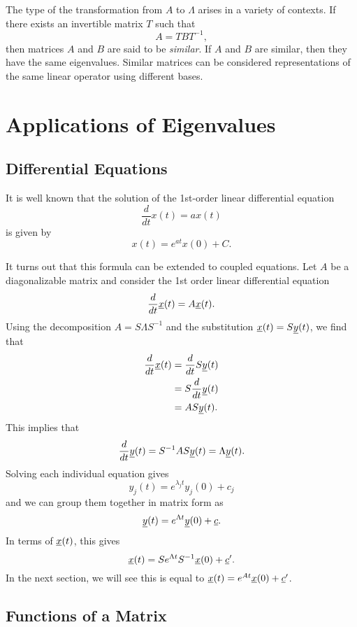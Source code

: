 The type of the transformation from $A$ to $\Lambda$ arises in a variety of contexts.
If there exists an invertible matrix $T$ such that
\begin{equation*}
A = T B T^{-1},
\end{equation*}
then matrices $A$ and $B$ are said to be \emph{similar}.
If $A$ and $B$ are similar, then they have the same eigenvalues.
Similar matrices can be considered representations of the same linear operator using different bases.

\section{Applications of Eigenvalues}

\subsection{Differential Equations}
\label{sec:Differential_Equations}

It is well known that the solution of the 1st-order linear differential equation
\[ \frac{d}{dt} x(t) = a x(t) \]
is given by
\[ x(t) = e^{at} x(0) + C. \]

It turns out that this formula can be extended to coupled equations.
Let $A$ be a diagonalizable matrix and consider the 1st order linear differential equation
\[ \frac{d}{dt} \underline{x}(t) = A \underline{x}(t). \]
Using the decomposition $A = S \Lambda S^{-1}$ and the substitution $\underline{x}(t) = S \underline{y}(t)$, we find that
\begin{align*}
\frac{d}{dt} \underline{x}(t)
& = \frac{d}{dt} S \underline{y}(t) \\
& = S \frac{d}{dt} \underline{y}(t) \\
& = A S \underline{y}(t).
\end{align*}
This implies that
\[ \frac{d}{dt} \underline{y}(t) = S^{-1} A S \underline{y}(t) = \Lambda \underline{y}(t). \]
Solving each individual equation gives
\[ y_j (t) = e^{\lambda_j t} y_j (0) + c_j \]
and we can group them together in matrix form as
\[ \underline{y}(t) = e^{\Lambda t} \underline{y}(0) + \underline{c}. \]
In terms of $\underline{x}(t)$, this gives
\[ \underline{x}(t) = S e^{\Lambda t} S^{-1} \underline{x}(0) + \underline{c}'. \]
In the next section, we will see this is equal to $ \underline{x}(t) = e^{A t} \underline{x}(0) + \underline{c}'$.

\subsection{Functions of a Matrix}

